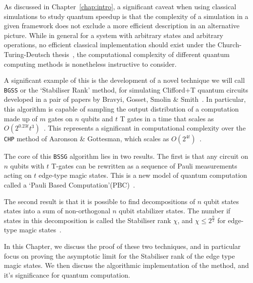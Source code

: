 \documentclass{standalone}
\begin{document}
As discussed in Chapter~\ref{chap:intro}, a significant caveat when using classical simulations to study quantum speedup is that the complexity of a simulation in a given framework does not exclude a more efficient description in an alternative picture. While in general for a system with arbitrary states and arbitrary operations, no efficient classical implementation should exist under the Church-Turing-Deutsch thesis~\cite{Deutsch1985}, the computational complexity of different quantum computing methods is nonetheless instructive to consider. 
\par
A significant example of this is the development of a novel technique we will call \texttt{BGSS} or the `Stabiliser Rank' method, for simulating Clifford+T quantum circuits developed in a pair of papers by Bravyi, Gosset, Smolin \& Smith~\cite{Bravyi2015,Bravyi2016b}. In particular, this algorithm is capable of sampling the output distribution of a computation made up of $m$ gates on $n$ qubits and $t$ T gates in a time that scales as $O(2^{0.23t}t^{3})$~\cite{Bravyi2016b}. This represents a significant in computational complexity over the \texttt{CHP} method of Aaronson \& Gottesman, which scales as $O(2^{4t})$~\cite{Aaronson2004a}.
\par
The core of this \texttt{BSSG} algorithm lies in two results. The first is that any circuit on $n$ qubits with $t$ T-gates can be rewritten as a sequence of Pauli measurements acting on $t$ edge-type magic states. This is a new model of quantum computation called a `Pauli Based Computation'(PBC)~\cite{Bravyi2015}. 
\par
The second result is that it is possible to find decompositions of $n$ qubit states states into a sum of non-orthogonal $n$ qubit stabilizer states. The number if states in this decomposition is called the Stabiliser rank $\chi$, and $\chi\leq2^{\frac{n}{2}}$ for edge-type magic states~\cite{Bravyi2016b,Bravyi2015}.
\par
In this Chapter, we discuss the proof of these two techniques, and in particular focus on proving the asymptotic limit for the Stabiliser rank of the edge type magic states. We then discuss the algorithmic implementation of the method, and it's significance for quantum computation. 
\end{document}
